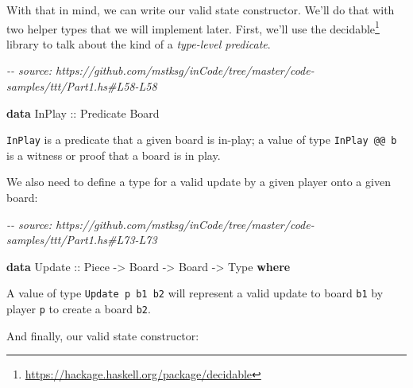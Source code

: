 \documentclass[]{article}
\newenvironment{Shaded}{}{}
\newcommand{\CommentTok}[1]{\textcolor[rgb]{0.38,0.63,0.69}{\textit{#1}}}
\newcommand{\DataTypeTok}[1]{\textcolor[rgb]{0.56,0.13,0.00}{#1}}
\newcommand{\KeywordTok}[1]{\textcolor[rgb]{0.00,0.44,0.13}{\textbf{#1}}}
\newcommand{\OtherTok}[1]{\textcolor[rgb]{0.00,0.44,0.13}{#1}}
\renewcommand{\href}[2]{#2\footnote{\url{#1}}}
\begin{document}
With that in mind, we can write our valid state constructor. We'll do that with
two helper types that we will implement later. First, we'll use the
\href{https://hackage.haskell.org/package/decidable}{decidable} library to talk
about the kind of a \emph{type-level predicate}.

\begin{Shaded}
\begin{Highlighting}[]
\CommentTok{{-}{-} source: https://github.com/mstksg/inCode/tree/master/code{-}samples/ttt/Part1.hs\#L58{-}L58}

\KeywordTok{data} \DataTypeTok{InPlay}\OtherTok{ ::} \DataTypeTok{Predicate} \DataTypeTok{Board}
\end{Highlighting}
\end{Shaded}

\texttt{InPlay} is a predicate that a given board is in-play; a value of type
\texttt{InPlay\ @@\ b} is a witness or proof that a board is in play.

We also need to define a type for a valid update by a given player onto a given
board:

\begin{Shaded}
\begin{Highlighting}[]
\CommentTok{{-}{-} source: https://github.com/mstksg/inCode/tree/master/code{-}samples/ttt/Part1.hs\#L73{-}L73}

\KeywordTok{data} \DataTypeTok{Update}\OtherTok{ ::} \DataTypeTok{Piece} \OtherTok{{-}>} \DataTypeTok{Board} \OtherTok{{-}>} \DataTypeTok{Board} \OtherTok{{-}>} \DataTypeTok{Type} \KeywordTok{where}
\end{Highlighting}
\end{Shaded}

A value of type \texttt{Update\ p\ b1\ b2} will represent a valid update to
board \texttt{b1} by player \texttt{p} to create a board \texttt{b2}.

And finally, our valid state constructor:
\end{document}
